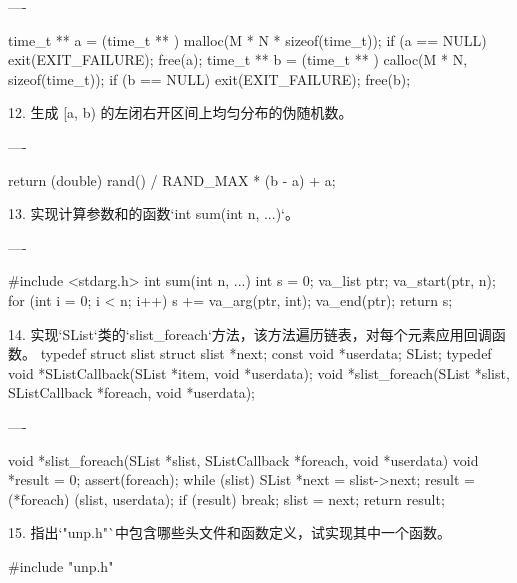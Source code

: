 ----

    time_t ** a = (time_t ** ) malloc(M * N * sizeof(time_t));
    if (a == NULL) exit(EXIT_FAILURE);
    free(a);
    time_t ** b = (time_t ** ) calloc(M * N, sizeof(time_t));
    if (b == NULL) exit(EXIT_FAILURE);
    free(b);

12. 生成 [a, b) 的左闭右开区间上均匀分布的伪随机数。

----

    return (double) rand() / RAND_MAX * (b - a) + a;

13. 实现计算参数和的函数`int sum(int n, ...)`。

----

    #include <stdarg.h>
    int sum(int n, ...) {
        int s = 0;
        va_list ptr;
        va_start(ptr, n);
        for (int i = 0; i < n; i++) {
          s += va_arg(ptr, int);
        }
        va_end(ptr);
        return s;
    }

14. 实现`SList`类的`slist_foreach`方法，该方法遍历链表，对每个元素应用回调函数。
    typedef struct slist {
      struct slist *next;
      const void *userdata;
    } SList;
    typedef void *SListCallback(SList *item, void *userdata);
    void *slist_foreach(SList *slist, SListCallback *foreach, void *userdata);

----

    void *slist_foreach(SList *slist, SListCallback *foreach, void *userdata)
    {
        void *result = 0;
        assert(foreach);
        while (slist) {
            SList *next = slist->next;
            result = (*foreach) (slist, userdata);
            if (result) break;
            slist = next;
        }
        return result;
    }

15. 指出`"unp.h"`中包含哪些头文件和函数定义，试实现其中一个函数。

    #include "unp.h"

